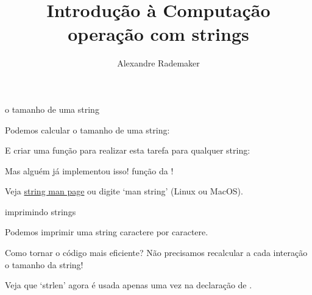 \documentclass{beamer}
\title{Introdução à Computação \\ operação com strings}
\author{Alexandre Rademaker}
\date{}
\begin{document}
\begin{frame}
 \maketitle
\end{frame}


\begin{frame}{o tamanho de uma string}

  Podemos calcular o tamanho de uma string:

  

  \framebreak

  E criar uma função para realizar esta tarefa para qualquer string:

  

  \framebreak

  Mas alguém já implementou isso! função  da
  !

  

  \framebreak

  Veja
  \href{https://man7.org/linux/man-pages/man3/string.3.html}{string
    man page} ou digite `man string' (Linux ou MacOS).

\end{frame}


\begin{frame}{imprimindo strings}

  Podemos imprimir uma string caractere por caractere. 

  

  \framebreak

  Como tornar o código mais eficiente? Não precisamos recalcular a
  cada interação o tamanho da string!

  Veja que `strlen' agora é usada apenas uma vez na declaração de
  .

  \framebreak

  

\end{frame}
\end{document}

